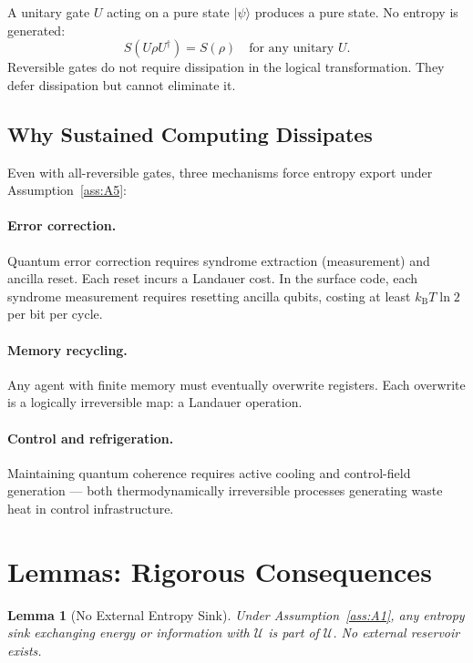 \documentclass[12pt,letterpaper]{article}
\theoremstyle{plain}
\newtheorem{lemma}[theorem]{Lemma}
\theoremstyle{definition}
\theoremstyle{remark}
\newcommand{\kB}{k_{\mathrm{B}}}
\newcommand{\lnTwo}{\ln 2}
\begin{document}
A unitary gate $U$ acting on a pure state $|\psi\rangle$ produces a pure state.  No entropy is
generated:
\begin{equation}
  S\!\left(U\rho U^{\dagger}\right) = S(\rho)
  \quad \text{for any unitary }U.
  \label{eq:unitary-entropy}
\end{equation}
Reversible gates do not require dissipation in the logical transformation.  They defer
dissipation but cannot eliminate it.

\subsection{Why Sustained Computing Dissipates}

Even with all-reversible gates, three mechanisms force entropy export under
Assumption~\ref{ass:A5}:

\paragraph{Error correction.}
Quantum error correction requires syndrome extraction (measurement) and ancilla reset.  Each
reset incurs a Landauer cost.  In the surface code, each syndrome measurement requires resetting
ancilla qubits, costing at least $\kB T\lnTwo$ per bit per cycle.

\paragraph{Memory recycling.}
Any agent with finite memory must eventually overwrite registers.  Each overwrite is a logically
irreversible map: a Landauer operation.

\paragraph{Control and refrigeration.}
Maintaining quantum coherence requires active cooling and control-field generation --- both
thermodynamically irreversible processes generating waste heat in control infrastructure.

\section{Lemmas: Rigorous Consequences}
\label{sec:lemmas}

\begin{lemma}[No External Entropy Sink]\label{lem:L1}
Under Assumption~\ref{ass:A1}, any entropy sink exchanging energy or information with
$\mathcal{U}$ is part of $\mathcal{U}$.  No external reservoir exists.
\end{lemma}
\end{document}
